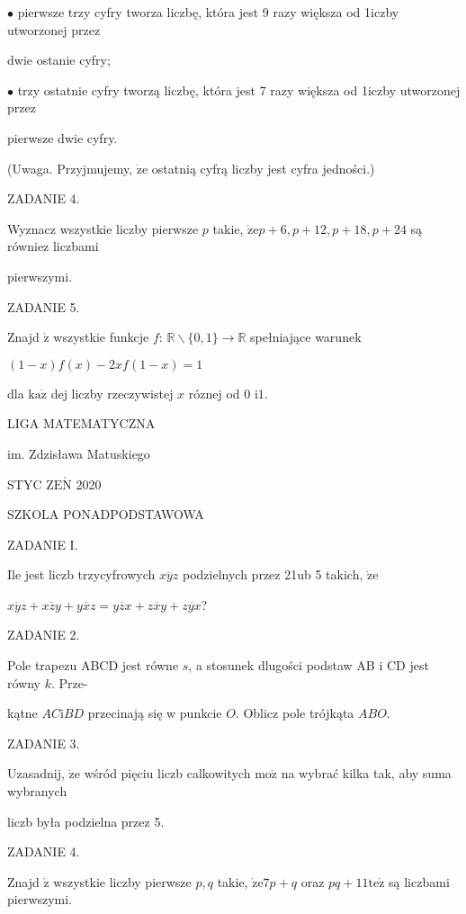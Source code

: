 \documentclass[a4paper,12pt]{article}
\begin{document}
$\bullet$ pierwsze trzy cyfry tworza liczbę, która jest 9 razy większa od 1iczby utworzonej przez

dwie ostanie cyfry;

$\bullet$ trzy ostatnie cyfry tworzą liczbę, która jest 7 razy większa od 1iczby utworzonej przez

pierwsze dwie cyfry.

(Uwaga. Przyjmujemy, $\dot{\mathrm{z}}\mathrm{e}$ ostatnią cyfrą liczby jest cyfra jedności.)

ZADANIE 4.

Wyznacz wszystkie liczby pierwsze $p$ takie, $\dot{\mathrm{z}}\mathrm{e}p+6, p+12, p+18, p+24$ są równiez liczbami

pierwszymi.

ZADANIE 5.

Znajd $\acute{\mathrm{z}}$ wszystkie funkcje $f$: $\mathbb{R}\backslash \{0,1\}\rightarrow \mathbb{R}$ spełniające warunek

$(1-x)f(x)-2xf(1-x)=1$

dla $\mathrm{k}\mathrm{a}\dot{\mathrm{z}}$ dej liczby rzeczywistej $x$ róznej od 0 $\mathrm{i}1.$






LIGA MATEMATYCZNA

im. Zdzisława Matuskiego

STYC Z$\mathrm{E}\acute{\mathrm{N}}$ 2020

SZKOLA PONADPODSTAWOWA

ZADANIE I.

Ile jest liczb trzycyfrowych $\overline{xyz}$ podzielnych przez 21ub 5 takich, $\dot{\mathrm{z}}\mathrm{e}$

$\overline{xyz}+\overline{xzy}+\overline{yxz}=\overline{yzx}+\overline{zxy}+\overline{zyx}$?

ZADANIE 2.

Pole trapezu ABCD jest równe $s$, a stosunek dlugości podstaw AB $\mathrm{i}$ CD jest równy $k$. Prze-

kątne $AC\mathrm{i}BD$ przecinają się w punkcie $O$. Oblicz pole trójkąta $ABO.$

ZADANIE 3.

Uzasadnij, $\dot{\mathrm{z}}\mathrm{e}$ wśród pięciu liczb calkowitych $\mathrm{m}\mathrm{o}\dot{\mathrm{z}}$ na wybrać kilka tak, aby suma wybranych

liczb była podzielna przez 5.

ZADANIE 4.

Znajd $\acute{\mathrm{z}}$ wszystkie liczby pierwsze $p, q$ takie, $\dot{\mathrm{z}}\mathrm{e}7p+q$ oraz $pq+11\mathrm{t}\mathrm{e}\dot{\mathrm{z}}$ są liczbami pierwszymi.
\end{document}
